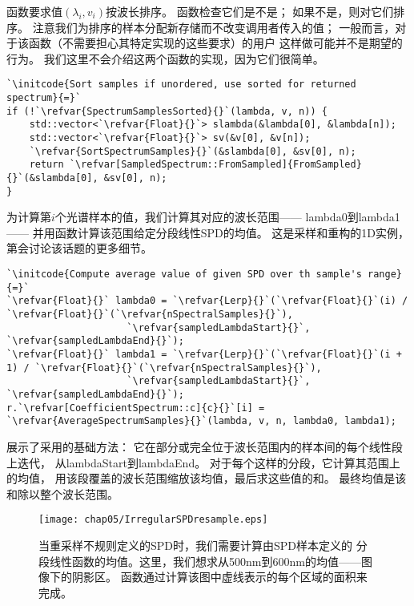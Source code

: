 函数要求值$(\lambda_i,v_i)$按波长排序。
{}函数检查它们是不是；
如果不是，则{}对它们排序。
注意我们为排序的样本分配新存储而不改变调用者传入的值；
一般而言，对于该函数（不需要担心其特定实现的这些要求）的用户
这样做可能并不是期望的行为。
我们这里不会介绍这两个函数的实现，因为它们很简单。
\begin{lstlisting}
`\initcode{Sort samples if unordered, use sorted for returned spectrum}{=}`
if (!`\refvar{SpectrumSamplesSorted}{}`(lambda, v, n)) {
    std::vector<`\refvar{Float}{}`> slambda(&lambda[0], &lambda[n]);
    std::vector<`\refvar{Float}{}`> sv(&v[0], &v[n]);
    `\refvar{SortSpectrumSamples}{}`(&slambda[0], &sv[0], n);
    return `\refvar[SampledSpectrum::FromSampled]{FromSampled}{}`(&slambda[0], &sv[0], n);
}
\end{lstlisting}

为计算第$i$个光谱样本的值，我们计算其对应的波长范围——
{\ttfamily lambda0}到{\ttfamily lambda1}——
并用函数计算该范围给定分段线性SPD的均值。
这是采样和重构的1D实例，第会讨论该话题的更多细节。
\begin{lstlisting}
`\initcode{Compute average value of given SPD over th sample's range}{=}`
`\refvar{Float}{}` lambda0 = `\refvar{Lerp}{}`(`\refvar{Float}{}`(i) / `\refvar{Float}{}`(`\refvar{nSpectralSamples}{}`),
                     `\refvar{sampledLambdaStart}{}`, `\refvar{sampledLambdaEnd}{}`);
`\refvar{Float}{}` lambda1 = `\refvar{Lerp}{}`(`\refvar{Float}{}`(i + 1) / `\refvar{Float}{}`(`\refvar{nSpectralSamples}{}`),
                     `\refvar{sampledLambdaStart}{}`, `\refvar{sampledLambdaEnd}{}`);
r.`\refvar[CoefficientSpectrum::c]{c}{}`[i] = `\refvar{AverageSpectrumSamples}{}`(lambda, v, n, lambda0, lambda1);
\end{lstlisting}

展示了采用的基础方法：
它在部分或完全位于波长范围内的样本间的每个线性段上迭代，
从{\ttfamily lambdaStart}到{\ttfamily lambdaEnd}。
对于每个这样的分段，它计算其范围上的均值，
用该段覆盖的波长范围缩放该均值，最后求这些值的和。
最终均值是该和除以整个波长范围。
\begin{figure}[htbp]
    \centering\texttt{[image: chap05/IrregularSPDresample.eps]}
    \caption{当重采样不规则定义的SPD时，我们需要计算由SPD样本定义的
        分段线性函数的均值。这里，我们想求从500nm到600nm的均值——图像下的阴影区。
        函数通过计算该图中虚线表示的每个区域的面积来完成。}
    \label{fig:5.2}
\end{figure}

